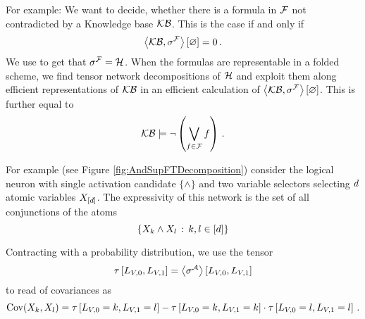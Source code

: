 \begin{example}
    For example: We want to decide, whether there is a formula in $\mathcal{F}$ not contradicted by a Knowledge base $\mathcal{KB}$.
    This is the case if and only if
    \[ \left\langle \mathcal{KB},\sigma^{\mathcal{F}}\right\rangle \left[ \varnothing \right] = 0 \, .  \]
    We use  to get that $\sigma^{\mathcal{F}}=\mathcal{H}$.
    When the formulas are representable in a folded scheme, we find tensor network decompositions of $\mathcal{H}$ and exploit them along efficient representations of $\mathcal{KB}$ in an efficient calculation of $\left\langle \mathcal{KB},\sigma^{\mathcal{F}}\right\rangle \left[ \varnothing \right] $.
    This is further equal to
    \[ \mathcal{KB} \models \lnot \left( \bigvee_{f\in\mathcal{F}} f\right) \, . \]
\end{example}


%










For example (see Figure \ref{fig:AndSupFTDecomposition}) consider the logical neuron with single activation candidate $\{\land\}$ and two variable selectors selecting $d$ atomic variables $X_{[d]}$.
The expressivity of this network is the set of all conjunctions of the atoms
\[ \{X_{k} \land X_{l} \, : \, k,l\in[d] \} \]


Contracting with a probability distribution, we use the tensor
\[ \tau\left[L_{V,0},L_{V,1}\right] = \left\langle \sigma^{\mathcal{A}}\right\rangle \left[ L_{V,0},L_{V,1} \right] \]
to read of covariances as
\[ \mathrm{Cov}(X_{k},X_{l}) = \tau\left[L_{V,0}=k,L_{V,1}=l\right]  -
\tau\left[L_{V,0}=k,L_{V,1}=k\right]  \cdot \tau\left[L_{V,0}=l,L_{V,1}=l\right] \, .  \]



